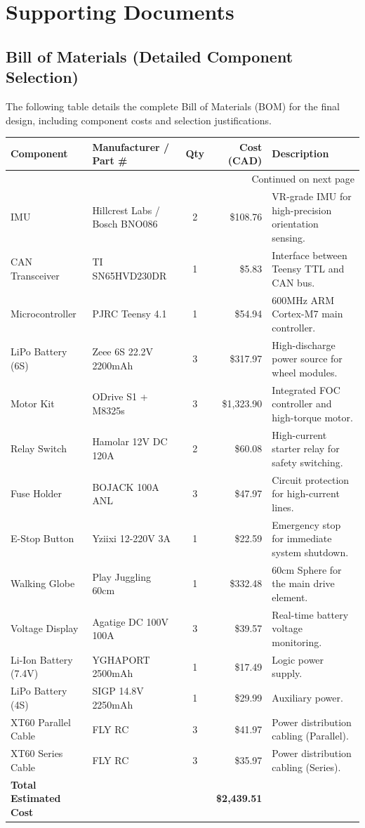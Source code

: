 \documentclass[12pt]{article}
\begin{document}
\section{Supporting Documents}

\subsection{Bill of Materials (Detailed Component Selection)}
The following table details the complete Bill of Materials (BOM) for the final design, including component costs and selection justifications.

\begin{longtable}{|p{}|p{}|c|r|p{}|}
\hline
\textbf{Component} & \textbf{Manufacturer / Part \#} & \textbf{Qty} & \textbf{Cost (CAD)} & \textbf{Description} \\ \hline
\endhead

\hline \multicolumn{5}{|r|}{{Continued on next page}} \\ \hline
\endfoot

\hline
\endlastfoot

IMU & Hillcrest Labs / Bosch BNO086 & 2 & \$108.76 & VR-grade IMU for high-precision orientation sensing. \\ \hline
CAN Transceiver & TI SN65HVD230DR & 1 & \$5.83 & Interface between Teensy TTL and CAN bus. \\ \hline
Microcontroller & PJRC Teensy 4.1 & 1 & \$54.94 & 600MHz ARM Cortex-M7 main controller. \\ \hline
LiPo Battery (6S) & Zeee 6S 22.2V 2200mAh & 3 & \$317.97 & High-discharge power source for wheel modules. \\ \hline
Motor Kit & ODrive S1 + M8325s & 3 & \$1,323.90 & Integrated FOC controller and high-torque motor. \\ \hline
Relay Switch & Hamolar 12V DC 120A & 2 & \$60.08 & High-current starter relay for safety switching. \\ \hline
Fuse Holder & BOJACK 100A ANL & 3 & \$47.97 & Circuit protection for high-current lines. \\ \hline
E-Stop Button & Yziixi 12-220V 3A & 1 & \$22.59 & Emergency stop for immediate system shutdown. \\ \hline
Walking Globe & Play Juggling 60cm & 1 & \$332.48 & 60cm Sphere for the main drive element. \\ \hline
Voltage Display & Agatige DC 100V 100A & 3 & \$39.57 & Real-time battery voltage monitoring. \\ \hline
Li-Ion Battery (7.4V) & YGHAPORT 2500mAh & 1 & \$17.49 & Logic power supply. \\ \hline
LiPo Battery (4S) & SIGP 14.8V 2250mAh & 1 & \$29.99 & Auxiliary power. \\ \hline
XT60 Parallel Cable & FLY RC & 3 & \$41.97 & Power distribution cabling (Parallel). \\ \hline
XT60 Series Cable & FLY RC & 3 & \$35.97 & Power distribution cabling (Series). \\ \hline
\textbf{Total Estimated Cost} & & & \textbf{\$2,439.51} & \\ \hline
\end{longtable}
\end{document}
